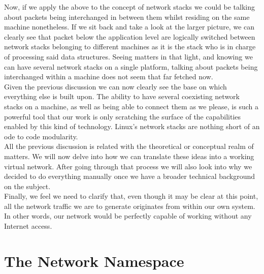         Now, if we apply the above to the concept of network stacks we could be talking about packets being interchanged in between them whilst residing on the same machine nonetheless. If we sit back and take a look at the larger picture, we can clearly see that packet below the application level are logically switched between network stacks belonging to different machines as it is the stack who is in charge of processing said data structures. Seeing matters in that light, and knowing we can have several network stacks on a single platform, talking about packets being interchanged within a machine does not seem that far fetched now.\\

        Given the previous discussion we can now clearly see the base on which everything else is built upon. The ability to have several coexisting network stacks on a machine, as well as being able to connect them as we please, is such a powerful tool that our work is only scratching the surface of the capabilities enabled by this kind of technology. Linux's network stacks are nothing short of an ode to code modularity.\\

        All the previous discussion is related with the theoretical or conceptual realm of matters. We will now delve into how we can translate these ideas into a working virtual network. After going through that process we will also look into why we decided to do everything manually once we have a broader technical background on the subject.\\

        Finally, we feel we need to clarify that, even though it may be clear at this point, all the network traffic we are to generate originates from within our own system. In other words, our network would be perfectly capable of working without any Internet access.\\

    \section{The Network Namespace}


